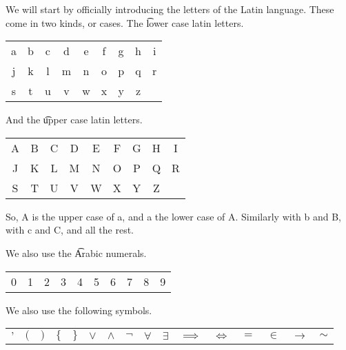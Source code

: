 We will start by officially introducing the letters of the Latin language.
These come in two kinds, or cases.
The \t{lower case latin letters}.
\begin{center}

   \begin{tabular}{ccccccccc}

   a & b & c & d & e & f & g & h & i \\

   j & k & l & m & n & o & p & q & r \\

   s & t & u & v & w & x & y & z & \\

   \end{tabular}

   \end{center}
And the \t{upper case latin letters}.
\begin{center}

\begin{tabular}{ccccccccc}

   A & B & C & D & E & F & G & H & I \\

   J & K & L & M & N & O & P & Q & R \\

   S & T & U & V & W & X & Y & Z & \\

\end{tabular}

\end{center}
So, A is the upper case of a, and a the lower case of A.
Similarly with b and B, with c and C, and all the rest.


We also use the \t{Arabic numerals}.
\begin{center}

   \begin{tabular}{cccccccccc}

   0 & 1 & 2 & 3 & 4 & 5 & 6 & 7 & 8 & 9 \\

   \end{tabular}

   \end{center}


We also use the following symbols.
\begin{center}
   \begin{tabular}{cccccccccccccccc}

   $’$ & $($ & $)$ & $\{$ & $\}$ & $\lor$ & $\land$ &
    $\neg$ & $\forall$ & $\exists$ & $\implies$ & $\iff$ & $=$ & $\in$ & $\to$ &
    $\sim$

   \end{tabular}

   \end{center}
